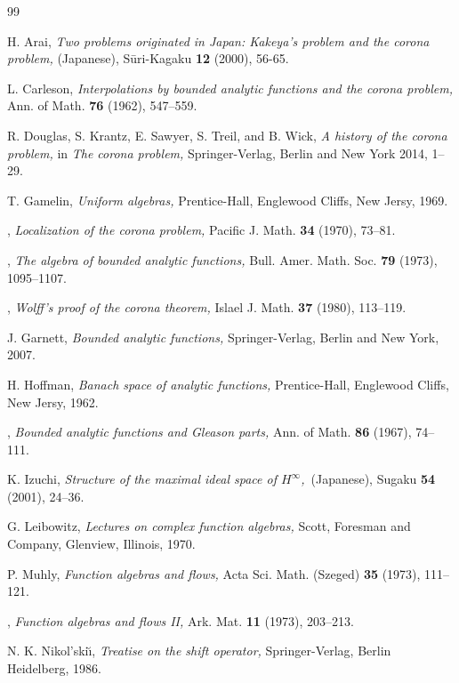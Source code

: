 \documentclass[12pt]{amsart}
\theoremstyle{plain}
\numberwithin{equation}{section}
\begin{document}
\begin{thebibliography}{99}

\medskip



H. Arai, {\em Two problems originated in Japan: Kakeya's problem
and the corona problem,\/} (Japanese),
S\={u}ri-Kagaku \textbf{12} (2000), 56-65.

L. Carleson, {\em Interpolations by bounded analytic
functions and the corona problem,\/} Ann. of
Math. \textbf{76} (1962), 547--559.

R. Douglas, S. Krantz, E. Sawyer, S. Treil, and B. Wick,
{\em A history of the corona problem,\/} in {\em The corona problem,\/}
Springer-Verlag, Berlin and New York 2014, 1--29.

T. Gamelin, {\em Uniform algebras,\/} Prentice-Hall, Englewood Cliffs,
New Jersy, 1969.

\bysame, {\em Localization of the corona problem,\/} Pacific J. Math.
\textbf{34} (1970), 73--81.

\bysame, {\em The algebra of bounded analytic functions,\/} Bull. Amer. Math. Soc.
\textbf{79} (1973), 1095--1107.

\bysame, {\em Wolff's proof of the corona theorem,\/} Islael J. Math.
\textbf{37} (1980), 113--119.

J. Garnett, {\em Bounded analytic functions,\/} Springer-Verlag,
Berlin and New York, 2007.

H. Hoffman, {\em Banach space of analytic functions,\/}
Prentice-Hall, Englewood Cliffs,
New Jersy, 1962.

\bysame, {\em Bounded analytic functions and Gleason parts,\/}
Ann. of Math. \textbf{86} (1967), 74--111.

K. Izuchi, {\em Structure of the maximal ideal space of $H^\infty$,\/}\, (Japanese), Sugaku \textbf{54} (2001), 24--36.

G. Leibowitz, {\em Lectures on complex function algebras,\/} Scott, Foresman
and Company, Glenview, Illinois, 1970.

P. Muhly, {\em Function algebras and flows,\/} Acta Sci. Math. (Szeged)
\textbf{35} (1973), 111--121.

\bysame, {\em Function algebras and flows II,\/} Ark. Mat.
\textbf{11} (1973), 203--213.

N. K. Nikol'ski\u{\i}, {\em Treatise on the shift operator,\/ }
Springer-Verlag, Berlin Heidelberg, 1986.


\end{thebibliography}
\end{document}
